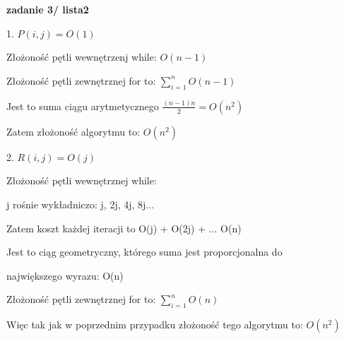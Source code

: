 \documentclass{article}
\begin{document}
    \textbf{zadanie 3/ lista2} \par
    1. $P(i, j) = O(1)$ \par
    Złożoność pętli wewnętrzenj while: $O(n - 1)$ \par
    Złożoność pętli zewnętrznej for to: $\sum_{i = 1}^{n} O(n-1)$ \par
    Jest to suma ciągu arytmetycznego $\frac{(n-1)n}{2} = O(n^2)$ \par
    Zatem złożoność algorytmu to: $O(n^2)$ \par
    \vspace{1\baselineskip}
    2. $R(i, j) = O(j)$ \par
    Złożoność pętli wewnętrznej while: \par
    j rośnie wykładniczo: j, 2j, 4j, 8j...\par
    Zatem koszt każdej iteracji to O(j) + O(2j) + ... O(n) \par
    Jest to ciąg geometryczny, którego suma jest proporcjonalna do  \par
    największego wyrazu: O(n) \par
    Złożoność pętli zewnętrznej for to: $\sum_{i = 1}^{n} O(n)$ \par
    Więc tak jak w poprzednim przypadku złożoność tego algorytmu to: $O(n^2)$ \par
    \vspace{1\baselineskip}
\end{document}
